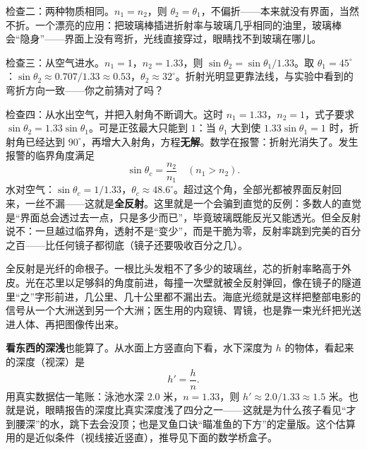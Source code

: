 检查二：两种物质相同。\(n_1=n_2\)，则 \(\theta_2=\theta_1\)，不偏折——本来就没有界面，当然不折。一个漂亮的应用：把玻璃棒插进折射率与玻璃几乎相同的油里，玻璃棒会“隐身”——界面上没有弯折，光线直接穿过，眼睛找不到玻璃在哪儿。

检查三：从空气进水。\(n_1=1\)，\(n_2=1.33\)，则 \(\sin\theta_2=\sin\theta_1/1.33\)。取 \(\theta_1=45^\circ\)：\(\sin\theta_2\approx 0.707/1.33\approx 0.53\)，\(\theta_2\approx 32^\circ\)。折射光明显更靠法线，与实验中看到的弯折方向一致——你之前猜对了吗？

检查四：从水出空气，并把入射角不断调大。这时 \(n_1=1.33\)，\(n_2=1\)，式子要求 \(\sin\theta_2=1.33\sin\theta_1\)。可是正弦最大只能到 \(1\)：当 \(\theta_1\) 大到使 \(1.33\sin\theta_1=1\) 时，折射角已经达到 \(90^\circ\)，再增大入射角，方程\textbf{无解}。数学在报警：折射光消失了。发生报警的临界角度满足
\[
\sin\theta_c=\frac{n_2}{n_1}\quad(n_1>n_2).
\]
水对空气：\(\sin\theta_c=1/1.33\)，\(\theta_c\approx 48.6^\circ\)。超过这个角，全部光都被界面反射回来，一丝不漏——这就是\textbf{全反射}。这里就是一个会骗到直觉的反例：多数人的直觉是“界面总会透过去一点，只是多少而已”，毕竟玻璃既能反光又能透光。但全反射说不：一旦越过临界角，透射不是“变少”，而是干脆为零，反射率跳到完美的百分之百——比任何镜子都彻底（镜子还要吸收百分之几）。

全反射是光纤的命根子。一根比头发粗不了多少的玻璃丝，芯的折射率略高于外皮。光在芯里以足够斜的角度前进，每撞一次壁就被全反射弹回，像在镜子的隧道里“之”字形前进，几公里、几十公里都不漏出去。海底光缆就是这样把整部电影的信号从一个大洲送到另一个大洲；医生用的内窥镜、胃镜，也是靠一束光纤把光送进人体、再把图像传出来。

\begin{center}
\end{center}

\textbf{看东西的深浅}也能算了。从水面上方竖直向下看，水下深度为 \(h\) 的物体，看起来的深度（视深）是
\[
h'=\frac{h}{n}.
\]
用真实数据估一笔账：泳池水深 \(2.0\) 米，\(n=1.33\)，则 \(h'\approx 2.0/1.33\approx 1.5\) 米。也就是说，眼睛报告的深度比真实深度浅了四分之一——这就是为什么孩子看见“才到腰深”的水，跳下去会没顶；也是叉鱼口诀“瞄准鱼的下方”的定量版。这个估算用的是近似条件（视线接近竖直），推导见下面的数学桥盒子。

